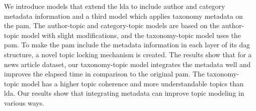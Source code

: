 We introduce models that extend the \gls{lda} to include author and category metadata information and a third model which applies taxonomy metadata on the \gls{pam}.
The author-topic and category-topic models are based on the author-topic model with slight modifications, and the taxonomy-topic model uses the \gls{pam}.
To make the \gls{pam} include the metadata information in each layer of its \gls{dag} structure, a novel topic locking mechanism is created.
The results show that for a news article dataset, our taxonomy-topic model integrates the metadata well and improves the elapsed time in comparison to the original \gls{pam}.
The taxonomy-topic model has a higher topic coherence and more understandable topics than \gls{lda}.
Our results show that integrating metadata can improve topic modeling in various ways.
